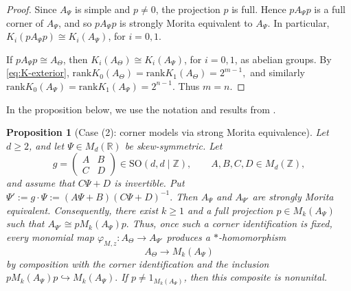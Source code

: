 \documentclass[11pt]{amsart}
\newtheorem{proposition}[theorem]{Proposition}
\theoremstyle{definition}
\theoremstyle{remark}
\newcommand{\Z}{\mathbb{Z}}
\newcommand{\R}{\mathbb{R}}
\newcommand{\SO}{\mathrm{SO}}
\newcommand{\rank}{\mathrm{rank}}
\begin{document}
\begin{proof}
Since \(A_\Psi\) is simple and \(p\neq0\), the projection \(p\) is full. Hence
\(pA_\Psi p\) is a full corner of \(A_\Psi\), and so \(pA_\Psi p\) is strongly
Morita equivalent to \(A_\Psi\). In particular, $K_i(pA_\Psi p)\cong K_i(A_\Psi)$,
for $i=0,1$. 

If $pA_\Psi p\cong A_\Theta$, then $K_i(A_\Theta)\cong K_i(A_\Psi)$, for $i=0,1$, as abelian groups. By \eqref{eq:K-exterior},
$\rank K_0(A_\Theta)=\rank K_1(A_\Theta)=2^{m-1},$
and similarly $\rank K_0(A_\Psi)=\rank K_1(A_\Psi)=2^{n-1}.$
Thus $m=n$.
\end{proof}
In the proposition below, we use the notation and results from \cite{RieffelSchwarz, LiStrongMorita}.
\begin{proposition}[Case (2): corner models via strong Morita equivalence]
\label{thm:case2-explicit}
Let $d\geq 2$, and let $\Psi\in M_d(\R)$ be skew-symmetric. Let
\[
g=
\begin{pmatrix}
A & B\\
C & D
\end{pmatrix}
\in \SO(d,d\mid\Z),
\qquad
A,B,C,D\in M_d(\Z),
\]
and assume that $C\Psi+D$ is invertible. Put $\Psi':=g\cdot\Psi:=(A\Psi+B)(C\Psi+D)^{-1}.$
Then $A_\Psi$ and $A_{\Psi'}$ are strongly Morita equivalent. Consequently,
there exist $k\geq 1$ and a full projection $p\in M_k(A_\Psi)$
such that $A_{\Psi'}\cong pM_k(A_\Psi)p.$ Thus, once such a corner identification is fixed, every monomial map
$\varphi_{M,z}\colon A_\Theta\longrightarrow A_{\Psi'}$
produces a $*$-homomorphism
\[
A_\Theta\longrightarrow M_k(A_\Psi)
\]
by composition with the corner identification and the inclusion $pM_k(A_\Psi)p\hookrightarrow M_k(A_\Psi).$
If $p\neq 1_{M_k(A_\Psi)}$, then this composite is nonunital.
\end{proposition}
\end{document}
